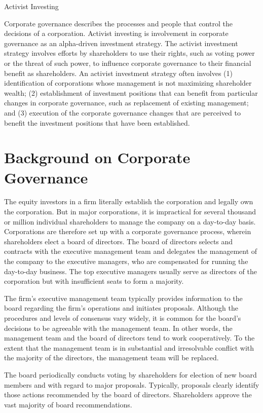\documentclass[11pt]{article}
\begin{document}
Activist Investing

Corporate governance describes the processes and people that control the decisions of a corporation. Activist investing is involvement in corporate governance as an alpha-driven investment strategy. The activist investment strategy involves efforts by shareholders to use their rights, such as voting power or the threat of such power, to influence corporate governance to their financial benefit as shareholders. An activist investment strategy often involves (1) identification of corporations whose management is not maximizing shareholder wealth; (2) establishment of investment positions that can benefit from particular changes in corporate governance, such as replacement of existing management; and (3) execution of the corporate governance changes that are perceived to benefit the investment positions that have been established.

\section*{Background on Corporate Governance}
The equity investors in a firm literally establish the corporation and legally own the corporation. But in major corporations, it is impractical for several thousand or million individual shareholders to manage the company on a day-to-day basis. Corporations are therefore set up with a corporate governance process, wherein shareholders elect a board of directors. The board of directors selects and contracts with the executive management team and delegates the management of the company to the executive managers, who are compensated for running the day-to-day business. The top executive managers usually serve as directors of the corporation but with insufficient seats to form a majority.

The firm's executive management team typically provides information to the board regarding the firm's operations and initiates proposals. Although the procedures and levels of consensus vary widely, it is common for the board's decisions to be agreeable with the management team. In other words, the management team and the board of directors tend to work cooperatively. To the extent that the management team is in substantial and irresolvable conflict with the majority of the directors, the management team will be replaced.

The board periodically conducts voting by shareholders for election of new board members and with regard to major proposals. Typically, proposals clearly identify those actions recommended by the board of directors. Shareholders approve the vast majority of board recommendations.
\end{document}
